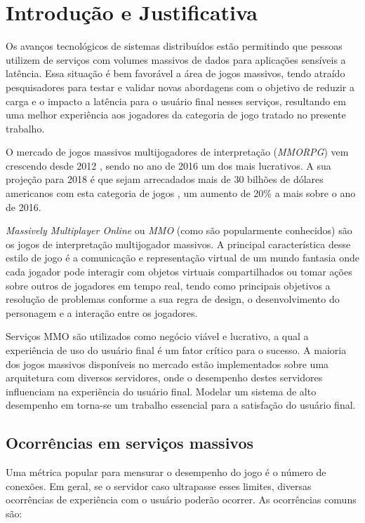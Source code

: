 \section{Introdução e Justificativa}
\label{sec:int}

Os avanços tecnológicos de sistemas distribuídos estão permitindo que pessoas utilizem de serviços com volumes massivos de dados para aplicações sensíveis a latência. Essa situação é bem favorável a área de jogos massivos, tendo atraído pesquisadores para testar e validar novas abordagens com o objetivo de reduzir a carga e o impacto a latência para o usuário final nesses serviços, resultando em uma melhor experiência aos jogadores da categoria de jogo tratado no presente trabalho\cite{mmo_analytic}.

O mercado de jogos massivos multijogadores de interpretação (\textit{MMORPG}) vem crescendo desde 2012 \cite{new_york_times}, sendo no ano de 2016 um dos mais lucrativos\cite{statista_2016}. A sua projeção para 2018 é que sejam arrecadados mais de 30 bilhões de dólares americanos com esta categoria de jogos \cite{statista_2018}, um aumento de 20\% a mais sobre o ano de 2016.

\textit{Massively Multiplayer Online} ou \textit{MMO} (como são popularmente conhecidos) são os jogos de interpretação multijogador massivos. A principal característica desse estilo de jogo é a comunicação e representação virtual de um mundo fantasia onde cada jogador pode interagir com objetos virtuais compartilhados ou tomar ações sobre outros de jogadores em tempo real, tendo como principais objetivos a resolução de problemas conforme a sua regra de design, o desenvolvimento do personagem e a interação entre os jogadores\cite{video_game_technologies}.

Serviços MMO são utilizados como negócio viável e lucrativo, a qual a experiência de uso do usuário final é um fator crítico para o sucesso. A maioria dos jogos massivos disponíveis no mercado estão implementados sobre uma arquitetura com diversos servidores, onde o desempenho destes servidores influenciam na experiência do usuário final. Modelar um sistema de alto desempenho em torna-se um trabalho essencial para a satisfação do usuário final\cite{1417630}.

\subsection{Ocorrências em serviços massivos}

Uma métrica popular para mensurar o desempenho do jogo é o número de conexões. Em geral, se o servidor caso ultrapasse esses limites, diversas ocorrências de experiência com o usuário poderão ocorrer. As ocorrências comuns são\cite{1417630}:

